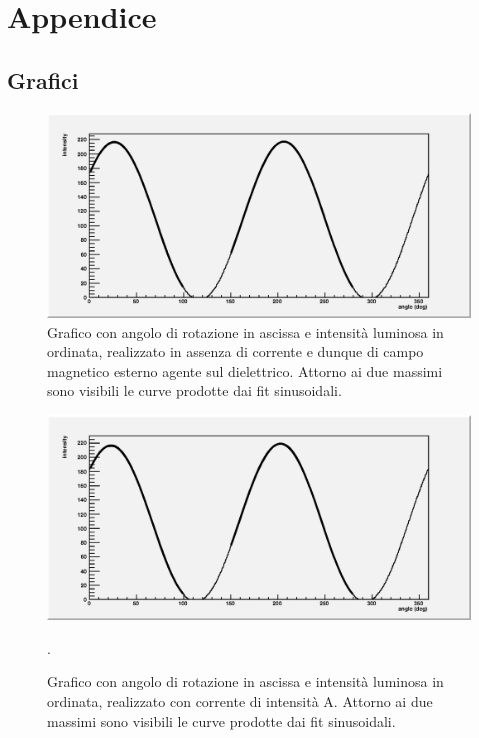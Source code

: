 \documentclass[italian,a4paper]{article}
\begin{document}
\newpage
\section{Appendice}
\subsection*{Grafici}
\begin{figure}[!h]\centering
\includegraphics[scale=.6]{0polar.eps}
\caption{Grafico con angolo di rotazione in ascissa e intensità luminosa in ordinata, realizzato in assenza di corrente e dunque di campo magnetico esterno agente sul dielettrico. Attorno ai due massimi sono visibili le curve prodotte dai fit sinusoidali.}\label{0amp}
\end{figure}
\begin{figure}[!h]\centering
\includegraphics[scale=.6]{1polar.eps}
\caption{Grafico con angolo di rotazione in ascissa e intensità luminosa in ordinata, realizzato con corrente di intensità \unit[1]{A}. Attorno ai due massimi sono visibili le curve prodotte dai fit sinusoidali.}.\label{1amp}
\end{figure}
\end{document}
